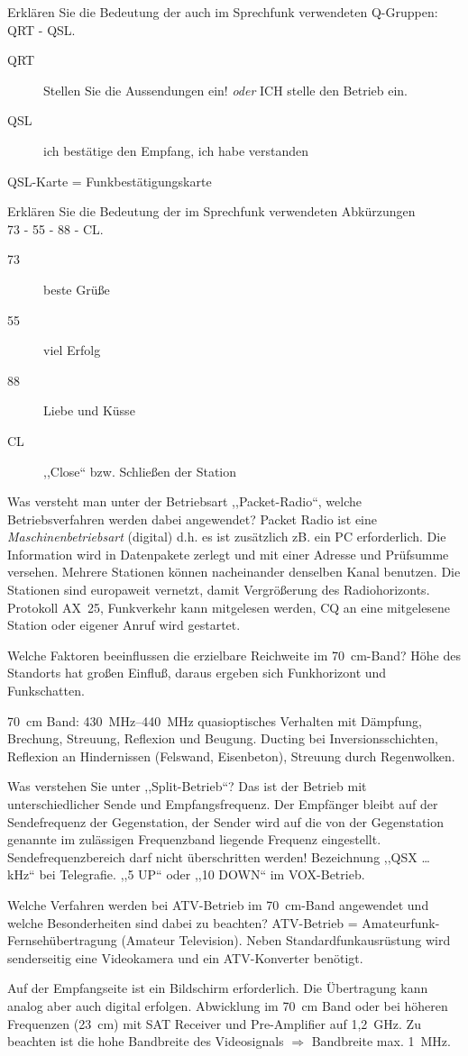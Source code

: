 \documentclass[avery5371,grid,frame,a4paper]{flashcards}
\newcommand{\card}[3]{
  \begin{flashcard}[{\chap} -- #1]{#2}#3\end{flashcard}
}
\begin{document}
\card{29}{Erklären Sie die Bedeutung der auch im Sprechfunk verwendeten Q-Gruppen: QRT - QSL.}{
  \begin{description}
    \item[QRT] Stellen Sie die Aussendungen ein! \textit{oder} ICH stelle den Betrieb ein.
    \item[QSL] ich bestätige den Empfang, ich habe verstanden
  \end{description}
  QSL-Karte = Funkbestätigungskarte
}
\card{30}{Erklären Sie die Bedeutung der im Sprechfunk verwendeten Abkürzungen \\ 73 - 55 - 88 - CL.}{
  \begin{description}
    \item[73] beste Grüße
    \item[55] viel Erfolg
    \item[88] Liebe und Küsse
    \item[CL] ,,Close`` bzw. Schließen der Station
  \end{description}
}
\card{31}{Was versteht man unter der Betriebsart ,,Packet-Radio``, welche Betriebsverfahren werden dabei angewendet?}{
  Packet Radio ist eine \emph{Maschinenbetriebsart} (digital) d.h. es ist zusätzlich zB. ein PC erforderlich. Die Information wird in Datenpakete zerlegt und mit einer Adresse und Prüfsumme versehen. Mehrere Stationen können nacheinander denselben Kanal benutzen. Die Stationen sind europaweit vernetzt, damit Vergrößerung des Radiohorizonts. Protokoll AX~25, Funkverkehr kann mitgelesen werden, CQ an eine mitgelesene Station oder eigener Anruf wird gestartet.
}
\card{32}{Welche Faktoren beeinflussen die erzielbare Reichweite im \SI{70}{\centi\metre}-Band?}{
  Höhe des Standorts hat großen Einfluß, daraus ergeben sich Funkhorizont und Funkschatten.

  \SI{70}{\centi\metre} Band: \SIrange{430}{440}{\mega\Hz} quasioptisches Verhalten mit Dämpfung, Brechung, Streuung, Reflexion und Beugung. Ducting bei Inversionsschichten, Reflexion an Hindernissen (Felswand, Eisenbeton), Streuung durch Regenwolken.
}
\card{33}{Was verstehen Sie unter ,,Split-Betrieb``?}{
  Das ist der Betrieb mit unterschiedlicher Sende und Empfangsfrequenz. Der Empfänger bleibt auf der Sendefrequenz der Gegenstation, der Sender wird auf die von der Gegenstation genannte im zulässigen Frequenzband liegende Frequenz eingestellt. Sendefrequenzbereich darf nicht überschritten werden! Bezeichnung ,,QSX \dots{} kHz`` bei Telegrafie. ,,5 UP`` oder ,,10 DOWN`` im VOX-Betrieb.
}
\card{34}{Welche Verfahren werden bei ATV-Betrieb im \SI{70}{\centi\metre}-Band angewendet und welche Besonderheiten sind dabei zu beachten?}{
  ATV-Betrieb = Amateurfunk-Fernsehübertragung (Amateur Television). Neben Standardfunkausrüstung wird senderseitig eine Videokamera und ein ATV-Konverter benötigt.

  Auf der Empfangseite ist ein Bildschirm erforderlich. Die Übertragung kann analog aber auch digital erfolgen. Abwicklung im \SI{70}{\centi\metre} Band oder bei höheren Frequenzen (\SI{23}{\centi\metre}) mit SAT Receiver und Pre-Amplifier auf 1,2~GHz. Zu beachten ist die hohe Bandbreite des Videosignals $\Rightarrow$ Bandbreite max. 1~MHz.
}
\end{document}
